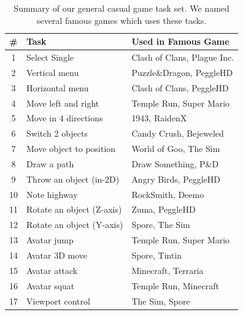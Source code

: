 \documentclass{sigchi}
\newcommand\tabhead[1]{\small\textbf{#1}}
\begin{document}
  \begin{table}
    \centering
    \begin{tabular}{|c|l|l|}
      \hline
      \tabhead{\#} &
      \multicolumn{1}{|p{0.4\columnwidth}|}{\centering\tabhead{Task}} &
      \multicolumn{1}{|p{0.45\columnwidth}|}{\centering\tabhead{Used in Famous Game}} \\
      \hline
      1 & Select Single & Clash of Clans, Plague Inc.\\
      \hline
      2 & Vertical menu & Puzzle\&Dragon, PeggleHD \\
      \hline
      3 & Horizontal menu & Clash of Clans, PeggleHD\\
      \hline
      4 & Move left and right & Temple Run, Super Mario\\
      \hline
      5 & Move in 4 directions & 1943, RaidenX\\
      \hline
      6 & Switch 2 objects & Candy Crush, Bejeweled\\
      \hline
      7 & Move object to position & World of Goo, The Sim\\
      \hline
      8 & Draw a path & Draw Something, P\&D\\
      \hline
      9 & Throw an object (in-2D) & Angry Birds, PeggleHD\\
      \hline
      10 & Note highway & RockSmith, Deemo\\
      \hline
      11 & Rotate an object (Z-axis) & Zuma, PeggleHD \\
      \hline
      12 & Rotate an object (Y-axis) & Spore, The Sim\\
      \hline
      13 & Avatar jump & Temple Run, Super Mario\\
      \hline
      14 & Avatar 3D move & Spore, Tintin\\
      \hline
      15 & Avatar attack & Minecraft, Terraria\\
      \hline
      16 & Avatar squat & Temple Run, Minecraft\\
      \hline
      17 & Viewport control & The Sim, Spore\\
      \hline

    \end{tabular}
    \caption{Summary of our general casual game task set. We named several famous games which uses these tasks.}
    \label{tab:table1}
  \end{table}
\end{document}
